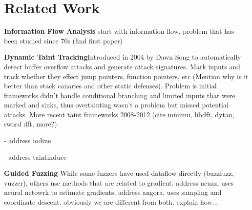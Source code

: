 \section{Related Work}

\noindent \textbf{Information Flow Analysis} start with information flow, problem that has been studied since 70s (find first paper)

\noindent \textbf{Dynamic Taint Tracking}Introduced in 2004 by Dawn Song to automatically detect buffer overflow attacks and generate attack signatures. Mark inputs and track whether they effect jump pointers, function pointers, etc (Mention why is it better than stack canaries and other static defenses). Problem is initial frameworks didn't handle conditional branching and limited inputs that were marked and sinks, thus overtainting wasn't a problem but missed potential attacks. More recent taint frameworks 2008-2012 (cite minimu, libdft, dytan, sword dft, more?) 

- address iodine

- address taintinduce

\noindent \textbf{Guided Fuzzing} While some fuzzers have used dataflow directly (buzzfuzz, vuzzer), others use methods that are related to gradient. address neuzz, uses neural netowrk to estimate gradients, address angora, uses sampling and coordinate descent. obviously we are different from both, explain how...





